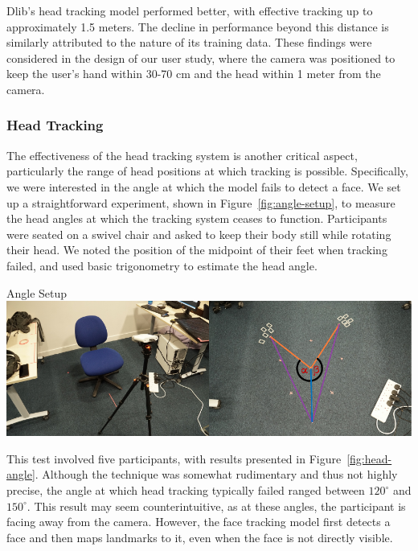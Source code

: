 Dlib's head tracking model performed better, with effective tracking up to approximately 1.5 meters. The decline in performance beyond this distance is similarly attributed to the nature of its training data. These findings were considered in the design of our user study, where the camera was positioned to keep the user's hand within 30-70 cm and the head within 1 meter from the camera.

\subsubsection{Head Tracking}

The effectiveness of the head tracking system is another critical aspect, particularly the range of head positions at which tracking is possible. Specifically, we were interested in the angle at which the model fails to detect a face. We set up a straightforward experiment, shown in Figure~\ref{fig:angle-setup}, to measure the head angles at which the tracking system ceases to function. Participants were seated on a swivel chair and asked to keep their body still while rotating their head. We noted the position of the midpoint of their feet when tracking failed, and used basic trigonometry to estimate the head angle.

\begin{figureBox}[label={fig:angle-setup}, width=1.0\linewidth]{Angle Setup}
    \includegraphics[width = 1.0\linewidth]{./evaluation/figures/angle-setup.pdf}
\end{figureBox}

This test involved five participants, with results presented in Figure~\ref{fig:head-angle}. Although the technique was somewhat rudimentary and thus not highly precise, the angle at which head tracking typically failed ranged between $120^{\circ}$ and $150^{\circ}$. This result may seem counterintuitive, as at these angles, the participant is facing away from the camera. However, the face tracking model first detects a face and then maps landmarks to it, even when the face is not directly visible.

